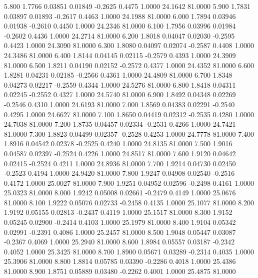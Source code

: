   5.800   1.7766   0.03851   0.01849  -0.2625   0.4475   1.0000  24.1642  81.0000
   5.900   1.7831   0.03897   0.01893  -0.2617   0.4463   1.0000  24.1988  81.0000
   6.000   1.7894   0.03946   0.01938  -0.2610   0.4450   1.0000  24.2346  81.0000
   6.100   1.7956   0.03996   0.01984  -0.2602   0.4436   1.0000  24.2714  81.0000
   6.200   1.8018   0.04047   0.02030  -0.2595   0.4423   1.0000  24.3090  81.0000
   6.300   1.8080   0.04097   0.02074  -0.2587   0.4408   1.0000  24.3486  81.0000
   6.400   1.8144   0.04145   0.02115  -0.2579   0.4393   1.0000  24.3909  81.0000
   6.500   1.8211   0.04190   0.02152  -0.2572   0.4377   1.0000  24.4352  81.0000
   6.600   1.8281   0.04231   0.02185  -0.2566   0.4361   1.0000  24.4809  81.0000
   6.700   1.8348   0.04273   0.02217  -0.2559   0.4344   1.0000  24.5276  81.0000
   6.800   1.8418   0.04311   0.02245  -0.2552   0.4327   1.0000  24.5740  81.0000
   6.900   1.8492   0.04348   0.02269  -0.2546   0.4310   1.0000  24.6193  81.0000
   7.000   1.8569   0.04383   0.02291  -0.2540   0.4295   1.0000  24.6627  81.0000
   7.100   1.8650   0.04419   0.02312  -0.2535   0.4280   1.0000  24.7038  81.0000
   7.200   1.8735   0.04457   0.02334  -0.2531   0.4266   1.0000  24.7421  81.0000
   7.300   1.8823   0.04499   0.02357  -0.2528   0.4253   1.0000  24.7778  81.0000
   7.400   1.8916   0.04542   0.02378  -0.2525   0.4240   1.0000  24.8135  81.0000
   7.500   1.9016   0.04587   0.02397  -0.2524   0.4226   1.0000  24.8517  81.0000
   7.600   1.9120   0.04642   0.02415  -0.2524   0.4211   1.0000  24.8936  81.0000
   7.700   1.9214   0.04730   0.02450  -0.2523   0.4194   1.0000  24.9420  81.0000
   7.800   1.9247   0.04908   0.02540  -0.2516   0.4172   1.0000  25.0027  81.0000
   7.900   1.9251   0.04952   0.02596  -0.2498   0.4161   1.0000  25.0323  81.0000
   8.000   1.9242   0.05008   0.02661  -0.2479   0.4149   1.0000  25.0676  81.0000
   8.100   1.9222   0.05076   0.02733  -0.2458   0.4135   1.0000  25.1077  81.0000
   8.200   1.9192   0.05155   0.02813  -0.2437   0.4119   1.0000  25.1517  81.0000
   8.300   1.9152   0.05245   0.02900  -0.2414   0.4103   1.0000  25.1979  81.0000
   8.400   1.9104   0.05342   0.02991  -0.2391   0.4086   1.0000  25.2457  81.0000
   8.500   1.9048   0.05447   0.03087  -0.2367   0.4069   1.0000  25.2940  81.0000
   8.600   1.8984   0.05557   0.03187  -0.2342   0.4052   1.0000  25.3425  81.0000
   8.700   1.8900   0.05671   0.03289  -0.2314   0.4035   1.0000  25.3906  81.0000
   8.800   1.8814   0.05785   0.03390  -0.2286   0.4018   1.0000  25.4386  81.0000
   8.900   1.8751   0.05889   0.03480  -0.2262   0.4001   1.0000  25.4875  81.0000
